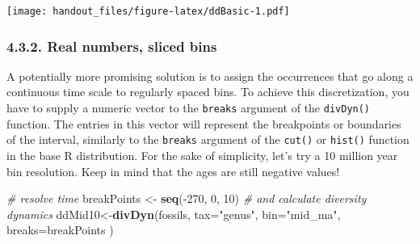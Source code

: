 \documentclass[]{article}
\newenvironment{Shaded}{\begin{snugshade}}{\end{snugshade}}
\newcommand{\KeywordTok}[1]{\textcolor[rgb]{0.13,0.29,0.53}{\textbf{{#1}}}}
\newcommand{\DataTypeTok}[1]{\textcolor[rgb]{0.13,0.29,0.53}{{#1}}}
\newcommand{\DecValTok}[1]{\textcolor[rgb]{0.00,0.00,0.81}{{#1}}}
\newcommand{\StringTok}[1]{\textcolor[rgb]{0.31,0.60,0.02}{{#1}}}
\newcommand{\CommentTok}[1]{\textcolor[rgb]{0.56,0.35,0.01}{\textit{{#1}}}}
\newcommand{\NormalTok}[1]{{#1}}
\begin{document}
\begin{Shaded}
\end{Shaded}

\texttt{[image: handout\_files/figure-latex/ddBasic-1.pdf]}

\subsubsection{4.3.2. Real numbers, sliced
bins}\label{real-numbers-sliced-bins}

A potentially more promising solution is to assign the occurrences that
go along a continuous time scale to regularly spaced bins. To achieve
this discretization, you have to supply a numeric vector to the
\texttt{breaks} argument of the \texttt{divDyn()} function. The entries
in this vector will represent the breakpoints or boundaries of the
interval, similarly to the \texttt{breaks} argument of the
\texttt{cut()} or \texttt{hist()} function in the base R distribution.
For the sake of simplicity, let's try a 10 million year bin resolution.
Keep in mind that the ages are still negative values!

\begin{Shaded}
\begin{Highlighting}[]
\CommentTok{# resolve time}
  \NormalTok{breakPoints <-}\StringTok{ }\KeywordTok{seq}\NormalTok{(-}\DecValTok{270}\NormalTok{, }\DecValTok{0}\NormalTok{, }\DecValTok{10}\NormalTok{)}
\CommentTok{# and calculate diversity dynamics}
  \NormalTok{ddMid10<-}\KeywordTok{divDyn}\NormalTok{(fossils, }\DataTypeTok{tax=}\StringTok{"genus"}\NormalTok{, }\DataTypeTok{bin=}\StringTok{"mid_ma"}\NormalTok{, }\DataTypeTok{breaks=}\NormalTok{breakPoints )}
\end{Highlighting}
\end{Shaded}
\end{document}
